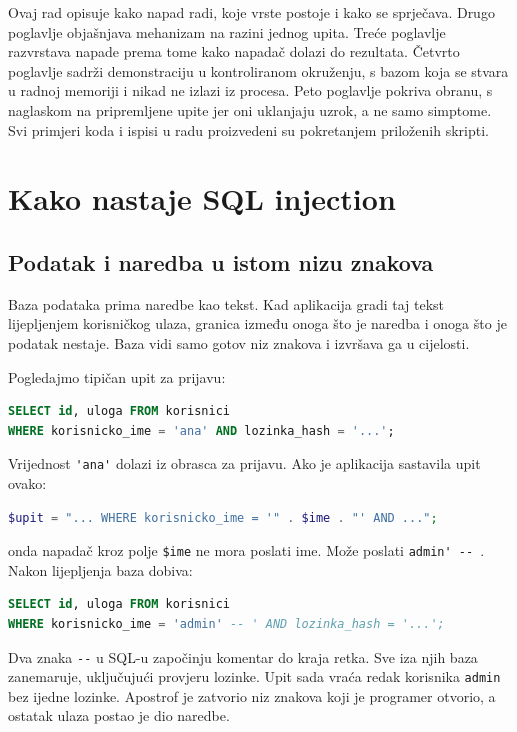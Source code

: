 \documentclass{mathos}
\begin{document}
Ovaj rad opisuje kako napad radi, koje vrste postoje i kako se sprječava. Drugo poglavlje objašnjava mehanizam na razini jednog upita. Treće poglavlje razvrstava napade prema tome kako napadač dolazi do rezultata. Četvrto poglavlje sadrži demonstraciju u kontroliranom okruženju, s bazom koja se stvara u radnoj memoriji i nikad ne izlazi iz procesa. Peto poglavlje pokriva obranu, s naglaskom na pripremljene upite jer oni uklanjaju uzrok, a ne samo simptome. Svi primjeri koda i ispisi u radu proizvedeni su pokretanjem priloženih skripti.


\chapter{Kako nastaje SQL injection}\label{mehanizam}

\section{Podatak i naredba u istom nizu znakova}

Baza podataka prima naredbe kao tekst. Kad aplikacija gradi taj tekst lijepljenjem korisničkog ulaza, granica između onoga što je naredba i onoga što je podatak nestaje. Baza vidi samo gotov niz znakova i izvršava ga u cijelosti.

Pogledajmo tipičan upit za prijavu:

\begin{lstlisting}[language=SQL]
SELECT id, uloga FROM korisnici
WHERE korisnicko_ime = 'ana' AND lozinka_hash = '...';
\end{lstlisting}

\noindent
Vrijednost \verb|'ana'| dolazi iz obrasca za prijavu. Ako je aplikacija sastavila upit ovako:

\begin{lstlisting}[language=PHP]
$upit = "... WHERE korisnicko_ime = '" . $ime . "' AND ...";
\end{lstlisting}

\noindent
onda napadač kroz polje \verb|$ime| ne mora poslati ime. Može poslati \verb|admin' -- |. Nakon lijepljenja baza dobiva:

\begin{lstlisting}[language=SQL]
SELECT id, uloga FROM korisnici
WHERE korisnicko_ime = 'admin' -- ' AND lozinka_hash = '...';
\end{lstlisting}

\noindent
Dva znaka \verb|--| u SQL-u započinju komentar do kraja retka. Sve iza njih baza zanemaruje, uključujući provjeru lozinke. Upit sada vraća redak korisnika \verb|admin| bez ijedne lozinke. Apostrof je zatvorio niz znakova koji je programer otvorio, a ostatak ulaza postao je dio naredbe.
\end{document}
